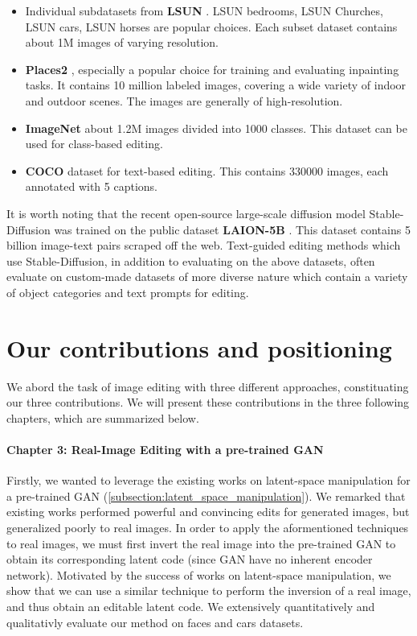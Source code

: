 \begin{itemize}
      \item Individual subdatasets from \textbf{LSUN} \citep{lsun}. LSUN bedrooms, LSUN Churches, LSUN cars, LSUN horses are popular choices. Each subset dataset contains about 1M images of varying resolution. 
      \item \textbf{Places2} \citep{zhou2017places}, especially a popular choice for training and evaluating inpainting tasks. It contains 10 million labeled images, covering a wide variety of indoor and outdoor scenes. The images are generally of high-resolution.
      \item \textbf{ImageNet} \citep{russakovsky2015imagenet_ilsvrc} about 1.2M images divided into 1000 classes. This dataset can be used for class-based editing.
      \item \textbf{COCO} dataset \citep{caesar2018cocoostuff} for text-based editing. This contains 330000 images, each annotated with 5 captions. 
\end{itemize}

It is worth noting that the recent open-source large-scale diffusion model Stable-Diffusion was trained 
on the public dataset \textbf{LAION-5B} \citep{schuhmann2022laion}. This dataset contains 
5 billion image-text pairs scraped off the web. Text-guided editing methods which use Stable-Diffusion, 
in addition to evaluating on the above datasets, often evaluate on custom-made datasets \citep{bar2022text2live, mokady2023null} of more diverse nature which contain a variety of object categories and 
text prompts for editing.


\section{Our contributions and positioning}

We abord the task of image editing with three different approaches, constituating our three 
contributions. We will present these contributions in the three following chapters, which 
are summarized below.

\paragraph{Chapter 3: Real-Image Editing with a pre-trained \ac{GAN}}

Firstly, we wanted to leverage the existing works on latent-space manipulation for a pre-trained \ac{GAN} 
(\ref{subsection:latent_space_manipulation}). We remarked that existing works performed powerful and 
convincing edits for generated images, but generalized poorly to real images. In order to apply the 
aformentioned techniques to real images, we must first invert the real image into the pre-trained \ac{GAN}
to obtain its corresponding latent code (since \ac{GAN} have no inherent encoder network). Motivated by 
the success of works on latent-space manipulation, we show that we can use a similar technique to 
perform the inversion of a real image, and thus obtain an editable latent code. We extensively 
quantitatively and qualitativly evaluate our method on faces and cars datasets.

